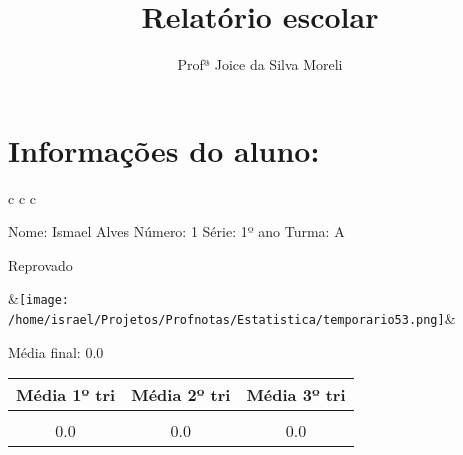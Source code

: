 \documentclass{article}%
\title{Relatório escolar}%
\author{Profª Joice da Silva Moreli}%
\begin{document}
%
\pagestyle{empty}%
\normalsize%
\maketitle%
\section*{Informações do aluno:}%
\label{sec:Informaesdoaluno}%
\begin{tabularx}{\textwidth}{c c c}%
\\%
\begin{minipage}[b]{0.25\textwidth}%
\flushleft%
Nome: Ismael Alves%
\newline%
Número: 1%
\newline%
Série: 1º ano%
\newline%
Turma: A%
\newline%
\newline%
\begin{Large}%
Reprovado%
\end{Large}%
\newline%
\newline%
\newline%
\end{minipage}&\texttt{[image: /home/israel/Projetos/Profnotas/Estatistica/temporario53.png]}&\begin{minipage}[b]{0.23\textwidth}%
\flushleft%
\begin{Large}%
Média final: 0.0%
\end{Large}%
\newline%
\newline%
\newline%
\begin{tabular}[b]{c | c | c}%
\textbf{Média 1º tri}&\textbf{Média 2º tri}&\textbf{Média 3º tri}\\%
\hline%
&&\\%
0.0&0.0&0.0\\%
\end{tabular}%
\newline%
\newline%
\newline%
\end{minipage}\\%
\end{tabularx}%
\end{document}
